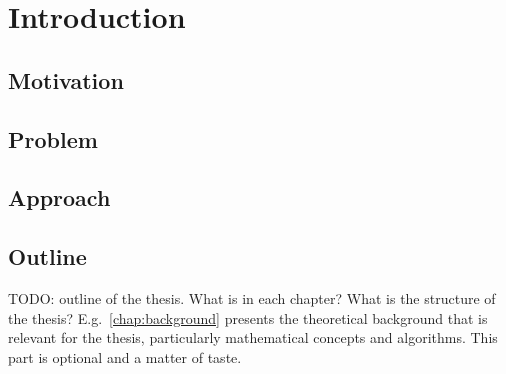 \chapter{Introduction}\label{chap:introduction}

\section{Motivation}

\section{Problem}

\section{Approach}

\section{Outline}

TODO: outline of the thesis.
What is in each chapter? What is the structure of the thesis?
E.g.\ \cref{chap:background} presents the theoretical background that is relevant for the thesis, particularly mathematical concepts and algorithms.
This part is optional and a matter of taste.


